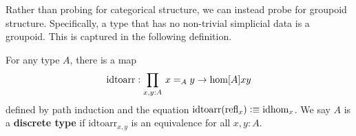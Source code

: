 \documentclass[main.tex]{subfiles}
\begin{document}
Rather than probing for categorical structure, we can instead probe for groupoid structure. Specifically, a type that has no
non-trivial simplicial data is a groupoid. This is captured in the following definition.
\begin{definition}
    For any type $A$, there is a map
    \begin{equation}
        \text{idtoarr} : \prd{x,y:A}x =_A y \to \hom[A]{x}{y}
    \end{equation}
    defined by path induction and the equation $\text{idtoarr}(\text{refl}_{x}) \vcentcolon\equiv \normalfont \text{idhom}_{x}$. We say $A$ is a \textbf{discrete type} if
    $\text{idtoarr}_{x,y}$ is an equivalence for all $x,y : A$.
\end{definition}
\end{document}
